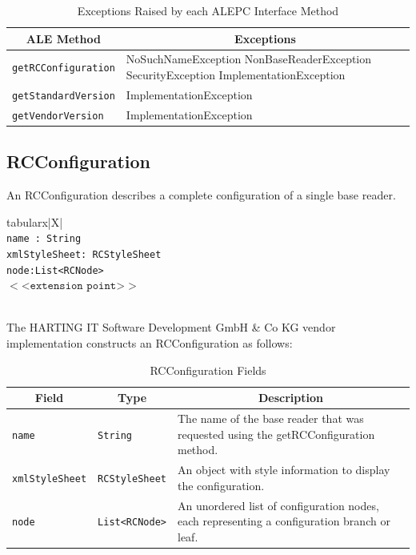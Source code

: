 \documentclass[11pt,a4paper,oneside]{article}
\newenvironment{bbox}%
{\begin{table}[h!]\begin{threeparttable}}%
{\end{threeparttable}\end{table}\FloatBarrier}
\newenvironment{bbox}
{\ifvmode\IgnorePar\fi \EndP\Tg<div class='bbox'>}{\Tg</div>\IgnoreIndent}
\begin{document}
\begin{table}[!h]
\begin{tabularx}{\linewidth}{|l|X|}
\hline
\multicolumn{1}{|c}{
\textbf{ALE Method}}&\multicolumn{1}{|c|}{\textbf{Exceptions}}\\
\hline
\texttt{getRCConfiguration}&NoSuchNameException\newline
NonBaseReaderException\newline
SecurityException\newline
ImplementationException\\
\hline
\texttt{getStandardVersion} &ImplementationException\\
\hline
\texttt{getVendorVersion}&ImplementationException\\
\hline
\end{tabularx}
\caption{Exceptions Raised by each ALEPC Interface Method}
\MakeLineNo 
\end{table}
\FloatBarrier

\subsection{RCConfiguration}
\label{subsec: RCConf}
An RCConfiguration describes a complete configuration of a single base reader.

\begin{bbox}
\begin{edtable}{tabularx}{\linewidth}{|X|}
\hline 
{}
\\
\texttt{name : String }\\
\texttt{xmlStyleSheet: RCStyleSheet}\\
\texttt{node:List<RCNode>}\\
$<$<$\texttt{extension point}$>$>$\\
\texttt{\textendash \textendash \textendash}\\
\hline
\end{edtable}
\end{bbox}

The HARTING IT Software Development GmbH \& Co KG vendor implementation constructs an RCConfiguration as follows:

\begin{table}[!h]
\begin{tabularx}{\textwidth}{|l|l|X|}
\hline
\multicolumn{1}{|c|}{\textbf{Field}}&
\multicolumn{1}{c|}{\textbf{Type}}&
\multicolumn{1}{c|}{\textbf{Description}}\\
\hline
\texttt{name}&\texttt{String}&The name of the base reader that was requested using the getRCConfiguration method.\\
\hline
\texttt{xmlStyleSheet}&\texttt{RCStyleSheet}&An object with style information to display the configuration.\\
\hline
\texttt{node}&\texttt{List<RCNode>}&An unordered list of configuration nodes, each representing a configuration branch or leaf.\\
\hline
\end {tabularx}
\caption{RCConfiguration Fields}
\MakeLineNo
\end{table}
\FloatBarrier
\end{document}
